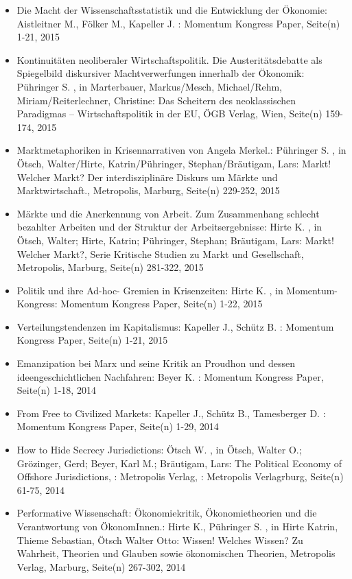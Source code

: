 \begin{itemize}
\item Die Macht der Wissenschaftsstatistik und die Entwicklung der Ökonomie: Aistleitner M., Fölker M., Kapeller J. : Momentum Kongress Paper, Seite(n) 1-21, 2015
\item Kontinuitäten neoliberaler Wirtschaftspolitik. Die Austeritätsdebatte als Spiegelbild diskursiver Machtverwerfungen innerhalb der Ökonomik: Pühringer S. , in Marterbauer, Markus/Mesch, Michael/Rehm, Miriam/Reiterlechner, Christine: Das Scheitern des neoklassischen Paradigmas – Wirtschaftspolitik in der EU, ÖGB Verlag, Wien, Seite(n) 159-174, 2015
\item Marktmetaphoriken in Krisennarrativen von Angela Merkel.: Pühringer S. , in Ötsch, Walter/Hirte, Katrin/Pühringer, Stephan/Bräutigam, Lars: Markt! Welcher Markt? Der interdisziplinäre Diskurs um Märkte und Marktwirtschaft., Metropolis, Marburg, Seite(n) 229-252, 2015
\item Märkte und die Anerkennung von Arbeit. Zum Zusammenhang schlecht bezahlter Arbeiten und der Struktur der Arbeitsergebnisse: Hirte K. , in Ötsch, Walter; Hirte, Katrin; Pühringer, Stephan; Bräutigam, Lars: Markt! Welcher Markt?, Serie Kritische Studien zu Markt und Gesellschaft, Metropolis, Marburg, Seite(n) 281-322, 2015
\item Politik und ihre Ad-hoc- Gremien in Krisenzeiten: Hirte K. , in Momentum-Kongress: Momentum Kongress Paper, Seite(n) 1-22, 2015
\item Verteilungstendenzen im Kapitalismus: Kapeller J., Schütz B. : Momentum Kongress Paper, Seite(n) 1-21, 2015
\item Emanzipation bei Marx und seine Kritik an Proudhon und dessen ideengeschichtlichen Nachfahren: Beyer K. : Momentum Kongress Paper, Seite(n) 1-18, 2014
\item From Free to Civilized Markets: Kapeller J., Schütz B., Tamesberger D. : Momentum Kongress Paper, Seite(n) 1-29, 2014
\item How to Hide Secrecy Jurisdictions: Ötsch W. , in Ötsch, Walter O.; Grözinger, Gerd; Beyer, Karl M.; Bräutigam, Lars: The Political Economy of Offshore Jurisdictions, : Metropolis Verlag, : Metropolis Verlagrburg, Seite(n) 61-75, 2014
\item Performative Wissenschaft: Ökonomiekritik, Ökonomietheorien und die Verantwortung von ÖkonomInnen.: Hirte K., Pühringer S. , in Hirte Katrin, Thieme Sebastian, Ötsch Walter Otto: Wissen! Welches Wissen? Zu Wahrheit, Theorien und Glauben sowie ökonomischen Theorien, Metropolis Verlag, Marburg, Seite(n) 267-302, 2014

\end{itemize}
